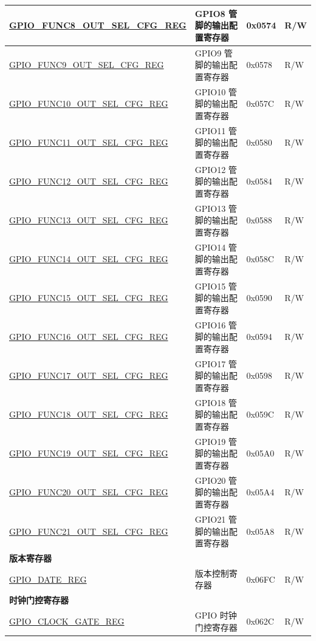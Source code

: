 \begin{longtable}{ | p{6cm} | p{6.7cm} | p{1.3cm} | p{1.5cm} | }
\hyperref[regdesc:GPIOFUNCNOUTSELCFGREG]{GPIO\_FUNC8\_OUT\_SEL\_CFG\_REG} & GPIO8 管脚的输出配置寄存器 & 0x0574 & R/W \\ \hline
\hyperref[regdesc:GPIOFUNCNOUTSELCFGREG]{GPIO\_FUNC9\_OUT\_SEL\_CFG\_REG} & GPIO9 管脚的输出配置寄存器 & 0x0578 & R/W \\ \hline
\hyperref[regdesc:GPIOFUNCNOUTSELCFGREG]{GPIO\_FUNC10\_OUT\_SEL\_CFG\_REG} & GPIO10 管脚的输出配置寄存器 & 0x057C & R/W \\ \hline
\hyperref[regdesc:GPIOFUNCNOUTSELCFGREG]{GPIO\_FUNC11\_OUT\_SEL\_CFG\_REG} & GPIO11 管脚的输出配置寄存器 & 0x0580 & R/W \\ \hline
\hyperref[regdesc:GPIOFUNCNOUTSELCFGREG]{GPIO\_FUNC12\_OUT\_SEL\_CFG\_REG} & GPIO12 管脚的输出配置寄存器 & 0x0584 & R/W \\ \hline
\hyperref[regdesc:GPIOFUNCNOUTSELCFGREG]{GPIO\_FUNC13\_OUT\_SEL\_CFG\_REG} & GPIO13 管脚的输出配置寄存器 & 0x0588 & R/W \\ \hline
\hyperref[regdesc:GPIOFUNCNOUTSELCFGREG]{GPIO\_FUNC14\_OUT\_SEL\_CFG\_REG} & GPIO14 管脚的输出配置寄存器 & 0x058C & R/W \\ \hline
\hyperref[regdesc:GPIOFUNCNOUTSELCFGREG]{GPIO\_FUNC15\_OUT\_SEL\_CFG\_REG} & GPIO15 管脚的输出配置寄存器 & 0x0590 & R/W \\ \hline
\hyperref[regdesc:GPIOFUNCNOUTSELCFGREG]{GPIO\_FUNC16\_OUT\_SEL\_CFG\_REG} & GPIO16 管脚的输出配置寄存器 & 0x0594 & R/W \\ \hline
\hyperref[regdesc:GPIOFUNCNOUTSELCFGREG]{GPIO\_FUNC17\_OUT\_SEL\_CFG\_REG} & GPIO17 管脚的输出配置寄存器 & 0x0598 & R/W \\ \hline
\hyperref[regdesc:GPIOFUNCNOUTSELCFGREG]{GPIO\_FUNC18\_OUT\_SEL\_CFG\_REG} & GPIO18 管脚的输出配置寄存器 & 0x059C & R/W \\ \hline
\hyperref[regdesc:GPIOFUNCNOUTSELCFGREG]{GPIO\_FUNC19\_OUT\_SEL\_CFG\_REG} & GPIO19 管脚的输出配置寄存器 & 0x05A0 & R/W \\ \hline
\hyperref[regdesc:GPIOFUNCNOUTSELCFGREG]{GPIO\_FUNC20\_OUT\_SEL\_CFG\_REG} & GPIO20 管脚的输出配置寄存器 & 0x05A4 & R/W \\ \hline
\hyperref[regdesc:GPIOFUNCNOUTSELCFGREG]{GPIO\_FUNC21\_OUT\_SEL\_CFG\_REG} & GPIO21 管脚的输出配置寄存器 & 0x05A8 & R/W \\ \hline

\multicolumn{4}{|l|}{\textbf{版本寄存器}} \\ \hline
\hyperref[regdesc:GPIOREGDATEREGREG]{GPIO\_DATE\_REG} & 版本控制寄存器 & 0x06FC & R/W \\ \hline

\multicolumn{4}{|l|}{\textbf{时钟门控寄存器}} \\ \hline
\hyperref[regdesc:GPIOCLOCKGATEREGREG]{GPIO\_CLOCK\_GATE\_REG} & GPIO 时钟门控寄存器 & 0x062C & R/W \\ \hline
\end{longtable}
